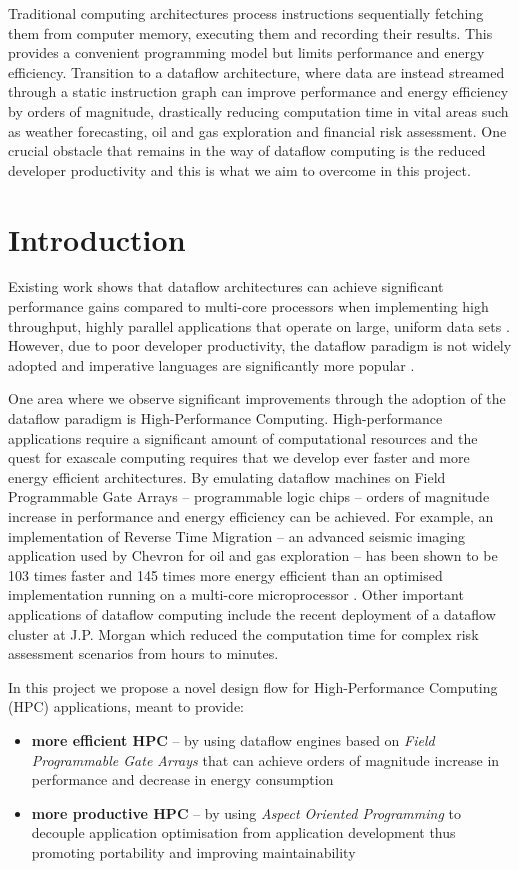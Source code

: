 Traditional computing architectures process instructions sequentially
fetching them from computer memory, executing them and recording their
results. This provides a convenient programming model but limits
performance and energy efficiency. Transition to a dataflow
architecture, where data are instead streamed through a static
instruction graph can improve performance and energy efficiency by
orders of magnitude, drastically reducing computation time in vital
areas such as weather forecasting, oil and gas exploration and
financial risk assessment. One crucial obstacle that remains in the
way of dataflow computing is the reduced developer productivity and
this is what we aim to overcome in this project.

\section{Introduction}

Existing work shows that dataflow architectures can achieve
significant performance gains compared to multi-core processors when
implementing high throughput, highly parallel applications that
operate on large, uniform data sets \cite{Flynn:Pell:Mencer:2012,
  Mencer:2012}.  However, due to poor developer productivity, the
dataflow paradigm is not widely adopted and imperative languages are
significantly more popular \cite{Tiobe:2012}.

One area where we observe significant improvements through the
adoption of the dataflow paradigm is High-Performance
Computing. High-performance applications require a significant amount
of computational resources and the quest for exascale computing
requires that we develop ever faster and more energy efficient
architectures. By emulating dataflow machines on Field Programmable
Gate Arrays -- programmable logic chips -- orders of magnitude
increase in performance and energy efficiency can be achieved.  For
example, an implementation of Reverse Time Migration -- an advanced
seismic imaging application used by Chevron for oil and gas
exploration -- has been shown to be 103 times faster and 145 times
more energy efficient than an optimised implementation running on a
multi-core microprocessor
\cite{Xinyu:Qiwei:Luk:Qiang:Pell:2012}. Other important applications
of dataflow computing include the recent deployment of a dataflow
cluster at J.P. Morgan which reduced the computation time for complex
risk assessment scenarios from hours to minutes.

In this project we propose a novel design flow for High-Performance
Computing (HPC) applications, meant to provide:
\begin{itemize}
\item \textbf{more efficient HPC} -- by using dataflow engines based on
  \emph{Field Programmable Gate Arrays} that can achieve orders of
  magnitude increase in performance and decrease in energy consumption
\item \textbf{more productive HPC} -- by using \emph{Aspect Oriented
  Programming} to decouple application optimisation from application
  development thus promoting portability and improving maintainability
\end{itemize}

